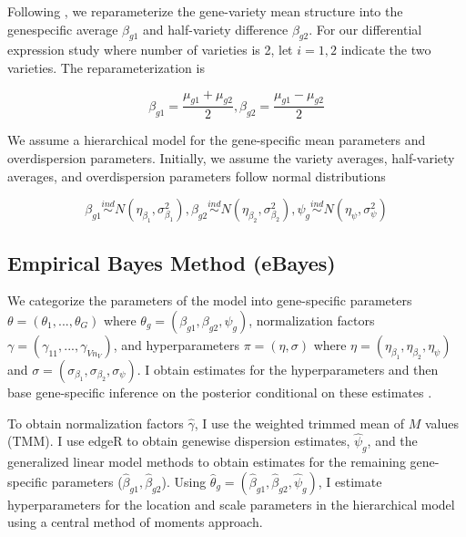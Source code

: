 Following \citep{ji2014estimation}, we reparameterize the gene-variety mean structure into the genespecific average $\beta_{g1}$ and half-variety difference $\beta_{g2}$. For our differential expression study where number of varieties is 2, let $i=1,2$ indicate the two varieties. The reparameterization is

\begin{equation}
\label{eq:3}
\beta_{g1} = \frac{\mu_{g1}+\mu_{g2}}{2}, \beta_{g2} = \frac{\mu_{g1}-\mu_{g2}}{2}
\end{equation}

We assume a hierarchical model for the gene-specific mean parameters and overdispersion parameters. Initially, we assume the variety averages, half-variety averages, and overdispersion parameters follow normal distributions

\begin{equation}
\label{eq:4}
\beta_{g1} \stackrel{ind}{\sim} N(\eta_{\beta_1}, \sigma^2_{\beta_1}), \beta_{g2} \stackrel{ind}{\sim} N(\eta_{\beta_2} , \sigma^2_{\beta_2}), \psi_g \stackrel{ind}{\sim} N(\eta_\psi, \sigma^2_\psi)
\end{equation}


\subsection{Empirical Bayes Method (eBayes)}

We categorize the parameters of the model into gene-specific parameters $\theta = (\theta_1, ..., \theta_G)$ where $\theta_g = (\beta_{g1}, \beta_{g2}, \psi_g)$, normalization factors $\gamma = (\gamma_{11}, ..., \gamma_{V n_V})$, and hyperparameters $\pi = (\eta, \sigma)$ where $\eta = (\eta_{\beta_1}, \eta_{\beta_2}, \eta_\psi)$ and $\sigma = (\sigma_{\beta_1}, \sigma_{\beta_2}, \sigma_\psi)$. I obtain estimates for the hyperparameters and then base gene-specific inference on the posterior conditional on these estimates \citep{niemi2015empirical}.

To obtain normalization factors $\hat{\gamma}$, I use the weighted trimmed mean of $M$ values (TMM). I use edgeR to obtain genewise dispersion estimates, $\hat{\psi}_g$, and the generalized linear model methods to obtain estimates for the remaining gene-specific parameters ($\hat{\beta}_{g1}, \hat{\beta}_{g2}$)\citep{robinson2010scaling}. Using $\hat{\theta}_g = (\hat{\beta}_{g1} , \hat{\beta}_{g2}, \hat{\psi}_g)$, I estimate hyperparameters for the location and scale parameters in the hierarchical model using a central method of moments approach. 

